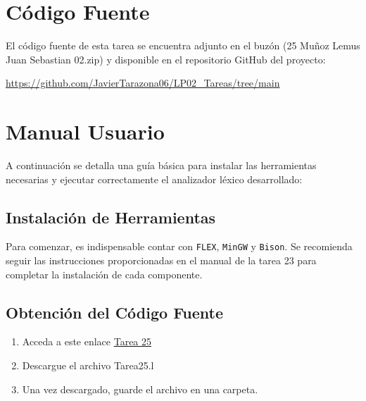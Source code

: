 \documentclass{article}
\begin{document}

\section{Código Fuente}\label{sec:cod}

El código fuente de esta tarea se encuentra adjunto en el buzón 
(25 Muñoz Lemus Juan Sebastian 02.zip)
y disponible en el repositorio GitHub del proyecto:

\begin{center}
\url{https://github.com/JavierTarazona06/LP02_Tareas/tree/main}
\end{center}


\section{Manual Usuario}\label{sec:man_u}

A continuación se detalla una guía básica para instalar las herramientas necesarias y ejecutar correctamente el analizador léxico desarrollado:

\subsection*{Instalación de Herramientas}

Para comenzar, es indispensable contar con \texttt{FLEX}, \texttt{MinGW} y \texttt{Bison}. Se recomienda seguir las instrucciones proporcionadas en el manual de la tarea 23 para completar la instalación de cada componente.

\subsection*{Obtención del Código Fuente}

\begin{enumerate}
    \item Acceda a este enlace \href{https://github.com/JavierTarazona06/LP02_Tareas/tree/main/Tarea25/Code}{Tarea 25}
    \item Descargue el archivo Tarea25.l
    \item Una vez descargado, guarde el archivo en una carpeta.
\end{enumerate}
\end{document}
